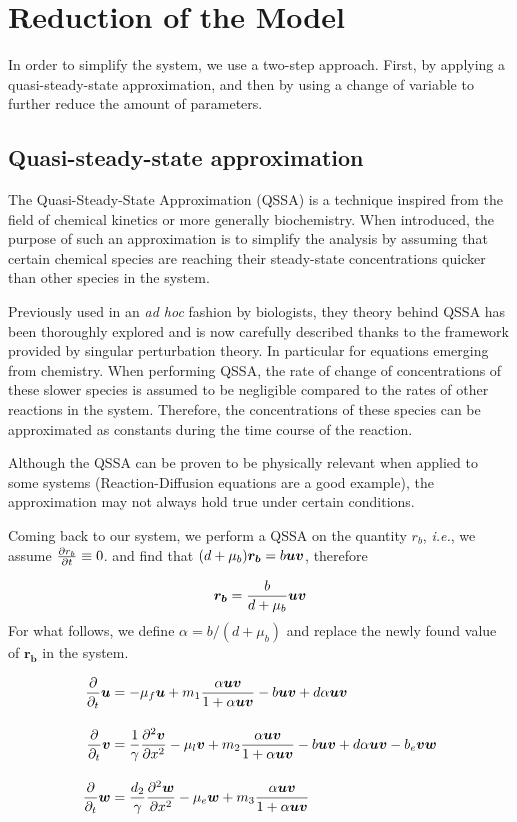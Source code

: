 \section{Reduction of the Model}

In order to simplify the system, we use a two-step approach. First, by applying a quasi-steady-state approximation, and then by using a change of variable to further reduce the amount of parameters. 

\subsection{Quasi-steady-state approximation}

The Quasi-Steady-State Approximation (QSSA) is a  technique inspired from the field of  chemical kinetics or more generally biochemistry. When introduced, the purpose of such an approximation is to simplify the analysis by assuming that certain chemical species are reaching their steady-state concentrations quicker than other species in the system.

Previously used in an \textit{ad hoc} fashion by biologists, they theory behind QSSA has been thoroughly explored and is now carefully described thanks to the framework provided by singular perturbation theory. In particular for equations emerging from chemistry.
When performing QSSA, the rate of change of concentrations of these slower species is assumed to be negligible compared to the rates of other reactions in the system. Therefore, the concentrations of these species can be approximated as constants during the time course of the reaction.

\begin{remark}
Although the QSSA can be proven to be physically relevant when applied to some systems (Reaction-Diffusion equations are a good example), the approximation may not always hold true under certain conditions.
\end{remark}

Coming back to our system, we perform a QSSA on the quantity $r_b$, \textit{i.e.}, we assume $\frac{\partial r_b}{\partial t} \equiv 0$. and find that $(d + \mu_b)\bm{r_b} = b \bm{u} \bm{v} $, therefore

$$\bm{r_b} = \dfrac{b}{d + \mu_b} \bm{u} \bm{v}$$
For what follows, we define $\alpha = b / (d + \mu_b)$ and replace the newly found value of $\bm{r_b}$ in the system.

\begin{align}
    \dfrac{\partial}{\partial_t} \bm{u} &= -\mu_f \bm{u} + m_1 \dfrac{\alpha \bm{u} \bm{v}}{1 + \alpha \bm{u} \bm{v}} - b \bm{u} \bm{v} + d \alpha \bm{u} \bm{v} \notag \\[1em]
    \dfrac{\partial}{\partial_t} \bm{v} &= \dfrac{1}{\gamma} \frac{\partial^2 \bm{v}}{\partial x^2} - \mu_l \bm{v} + m_2 \dfrac{\alpha \bm{u} \bm{v}}{1 + \alpha \bm{u}\bm{v}} - b \bm{u} \bm{v} + d \alpha \bm{u} \bm{v} - b_e \bm{v}\bm{w}  \\[1em]
    \dfrac{\partial}{\partial_t} \bm{w} &= \dfrac{d_2}{\gamma} \frac{\partial^2 \bm{w}}{\partial x^2} - \mu_e \bm{w} + m_3 \dfrac{\alpha\bm{u}\bm{v}}{1 + \alpha\bm{u}\bm{v}} \notag
\end{align}

